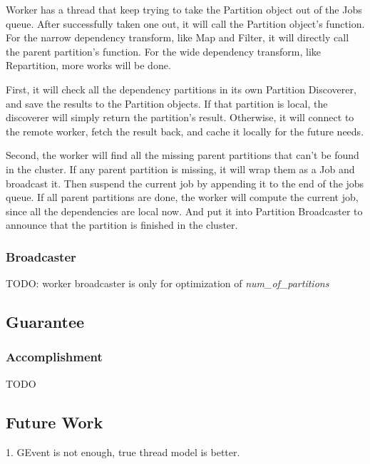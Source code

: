 Worker has a thread that keep trying to take the Partition object out of the Jobs queue.
After successfully taken one out, it will call the Partition object's function.
For the narrow dependency transform, like Map and Filter, it will directly call the parent partition's function.
For the wide dependency transform, like Repartition, more works will be done.

First, it will check all the dependency partitions in its own Partition Discoverer,
and save the results to the Partition objects.
If that partition is local, the discoverer will simply return the partition's result.
Otherwise, it will connect to the remote worker, fetch the result back, and cache it locally for the future needs.

Second, the worker will find all the missing parent partitions that can't be found in the cluster.
If any parent partition is missing, it will wrap them as a Job and broadcast it.
Then suspend the current job by appending it to the end of the jobs queue.
If all parent partitions are done, the worker will compute the current job, since all the dependencies are local now.
And put it into Partition Broadcaster to announce that the partition is finished in the cluster.

\subsubsection{Broadcaster} %
\label{ssub:broadcaster}
TODO: worker broadcaster is only for optimization of \emph{num\_of\_partitions}


\subsection{Guarantee} %
\label{sub:guarantee}

\subsubsection{Accomplishment} %
\label{ssub:accomplishment}
TODO



\subsection{Future Work} %
\label{sub:future_work_on_driver_less}
1. GEvent is not enough, true thread model is better.



